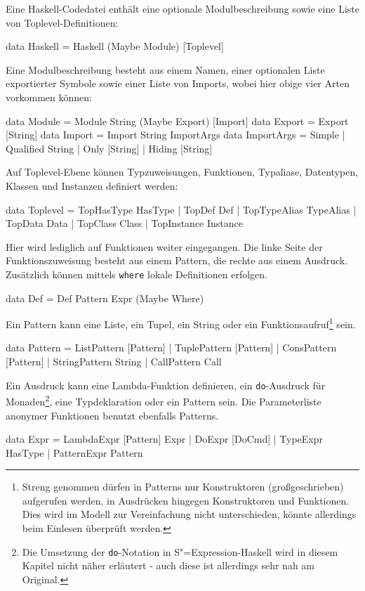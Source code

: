 \documentclass[11pt, a4paper, bibgerm]{scrbook}
\newcommand\icode[1]{\lstinline?#1?}
\newcommand{\sexp}{S"=Expression}
\begin{document}
Eine Haskell-Codedatei enthält eine optionale Modulbeschreibung sowie
eine Liste von Toplevel-Definitionen:
\begin{code}
data Haskell = Haskell (Maybe Module) [Toplevel]
\end{code}
Eine Modulbeschreibung besteht aus einem Namen, einer optionalen Liste
exportierter Symbole sowie einer Liste von Imports, wobei hier obige
vier Arten vorkommen können:
\begin{code}
data Module = Module String (Maybe Export) [Import]
data Export = Export [String]
data Import = Import String ImportArgs
data ImportArgs = Simple
                | Qualified String
                | Only [String]
                | Hiding [String]
\end{code}
Auf Toplevel-Ebene können Typzuweisungen, Funktionen, Typaliase,
Datentypen, Klassen und Instanzen definiert werden:
\begin{code}
data Toplevel = TopHasType HasType
              | TopDef Def
              | TopTypeAlias TypeAlias
              | TopData Data
              | TopClass Class
              | TopInstance Instance
\end{code}
Hier wird lediglich auf Funktionen weiter eingegangen. Die linke Seite der
Funktionszuweisung besteht aus einem Pattern, die rechte aus einem
Ausdruck. Zusätzlich können mittels \icode{where} lokale Definitionen
erfolgen.
\begin{code}
data Def = Def Pattern Expr (Maybe Where)
\end{code}
Ein Pattern kann eine Liste, ein Tupel, ein String oder ein
Funktionsaufruf\footnote{Streng genommen dürfen in Patterns nur
  Konstruktoren (großgeschrieben) aufgerufen werden, in Ausdrücken
  hingegen Konstruktoren und Funktionen. Dies wird im Modell zur
  Vereinfachung nicht unterschieden, könnte allerdings beim Einlesen
  überprüft werden.} sein.
\begin{code}
data Pattern = ListPattern [Pattern]
             | TuplePattern [Pattern]
             | ConsPattern [Pattern]
             | StringPattern String
             | CallPattern Call
\end{code}
Ein Ausdruck kann eine Lambda-Funktion definieren, ein
\icode{do}-Ausdruck für Monaden\footnote{Die Umsetzung der
  \icode{do}-Notation in \sexp{}-Haskell wird in diesem Kapitel nicht
  näher erläutert - auch diese ist allerdings sehr nah am
  Original.}, eine Typdeklaration oder ein Pattern sein. Die
Parameterliste anonymer Funktionen benutzt ebenfalls Patterns.
\begin{code}
data Expr = LambdaExpr  [Pattern] Expr
          | DoExpr      [DoCmd]
          | TypeExpr    HasType
          | PatternExpr Pattern
\end{code}
\end{document}
